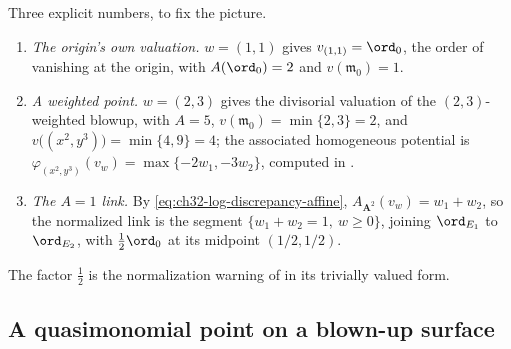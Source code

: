 \begin{example}
Three explicit numbers, to fix the picture.
\begin{enumerate}
\item\emph{The origin's own valuation.}  $w=(1,1)$ gives
$v_{(1,1)}=\ord_0$, the order of vanishing at the origin, with
$A(\ord_0)=2$ and $v(\mathfrak m_0)=1$.
\item\emph{A weighted point.}  $w=(2,3)$ gives the divisorial valuation of
the $(2,3)$-weighted blowup, with $A=5$,
$v(\mathfrak m_0)=\min\{2,3\}=2$, and
$v\bigl((x^2,y^3)\bigr)=\min\{4,9\}=4$; the associated homogeneous
potential is
$\varphi_{(x^2,y^3)}(v_w)=\max\{-2w_1,-3w_2\}$, computed in
.
\item\emph{The $A=1$ link.}  By
\eqref{eq:ch32-log-discrepancy-affine}, $A_{\mathbf A^2}(v_w)=w_1+w_2$,
so the normalized link is the segment
$\{w_1+w_2=1,\ w\geq0\}$, joining $\ord_{E_1}$ to $\ord_{E_2}$, with
$\tfrac12\ord_0$ at its midpoint $(1/2,1/2)$.
\end{enumerate}
The factor $\tfrac12$ is the normalization warning of
 in its trivially valued form.
\end{example}

\subsection{A quasimonomial point on a blown-up surface}
\label{sec:ch32-blowup-surface}


